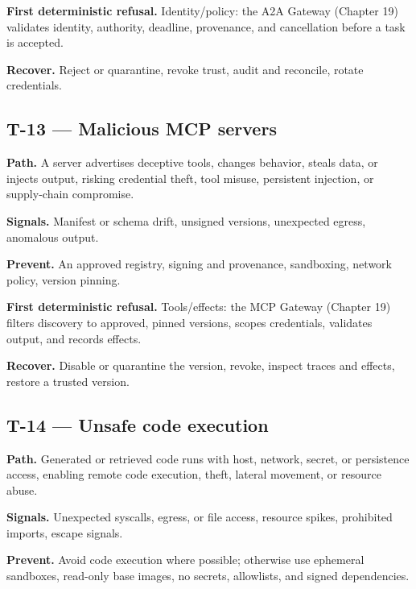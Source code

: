 \textbf{First deterministic refusal.} Identity/policy: the A2A Gateway (Chapter 19) validates identity, authority, deadline, provenance, and cancellation before a task is accepted.\par

\textbf{Recover.} Reject or quarantine, revoke trust, audit and reconcile, rotate credentials.\par

\subsection{T-13 — Malicious MCP servers}

\textbf{Path.} A server advertises deceptive tools, changes behavior, steals data, or injects output, risking credential theft, tool misuse, persistent injection, or supply-chain compromise.\par

\textbf{Signals.} Manifest or schema drift, unsigned versions, unexpected egress, anomalous output.\par

\textbf{Prevent.} An approved registry, signing and provenance, sandboxing, network policy, version pinning.\par

\textbf{First deterministic refusal.} Tools/effects: the MCP Gateway (Chapter 19) filters discovery to approved, pinned versions, scopes credentials, validates output, and records effects.\par

\textbf{Recover.} Disable or quarantine the version, revoke, inspect traces and effects, restore a trusted version.\par

\subsection{T-14 — Unsafe code execution}

\textbf{Path.} Generated or retrieved code runs with host, network, secret, or persistence access, enabling remote code execution, theft, lateral movement, or resource abuse.\par

\textbf{Signals.} Unexpected syscalls, egress, or file access, resource spikes, prohibited imports, escape signals.\par

\textbf{Prevent.} Avoid code execution where possible; otherwise use ephemeral sandboxes, read-only base images, no secrets, allowlists, and signed dependencies.\par

